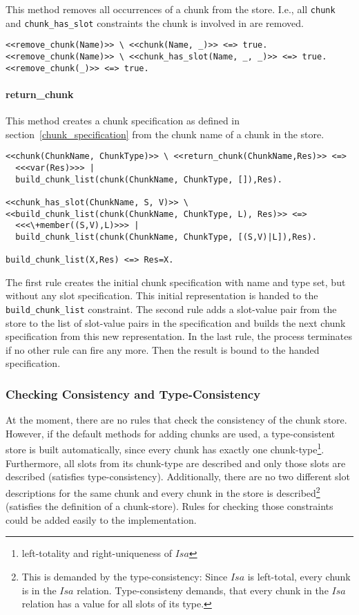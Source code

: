 This method removes all occurrences of a chunk from the store. I.e., all \lstinline|chunk| and \lstinline|chunk_has_slot| constraints the chunk is involved in are removed.

\begin{lstlisting}
<<remove_chunk(Name)>> \ <<chunk(Name, _)>> <=> true.
<<remove_chunk(Name)>> \ <<chunk_has_slot(Name, _, _)>> <=> true.
<<remove_chunk(_)>> <=> true.
\end{lstlisting}

\paragraph{return\_chunk}

This method creates a chunk specification as defined in section~\ref{chunk_specification} from the chunk name of a chunk in the store.

\begin{lstlisting}[caption={rules for \texttt{return\_chunk}}]
<<chunk(ChunkName, ChunkType)>> \ <<return_chunk(ChunkName,Res)>> <=> 
  <<<var(Res)>>> | 
  build_chunk_list(chunk(ChunkName, ChunkType, []),Res).

<<chunk_has_slot(ChunkName, S, V)>> \ <<build_chunk_list(chunk(ChunkName, ChunkType, L), Res)>> <=> 
  <<<\+member((S,V),L)>>> | 
  build_chunk_list(chunk(ChunkName, ChunkType, [(S,V)|L]),Res).
  
build_chunk_list(X,Res) <=> Res=X.
\end{lstlisting}

The first rule creates the initial chunk specification with name and type set, but without any slot specification. This initial representation is handed to the \lstinline|build_chunk_list| constraint. The second rule adds a slot-value pair from the store to the list of slot-value pairs in the specification and builds the next chunk specification from this new representation. In the last rule, the process terminates if no other rule can fire any more. Then the result is bound to the handed specification.

\subsubsection{Checking Consistency and Type-Consistency}

At the moment, there are no rules that check the consistency of the chunk store. However, if the default methods for adding chunks are used, a type-consistent store is built automatically, since every chunk has exactly one chunk-type\footnote{left-totality and right-uniqueness of $Isa$}. Furthermore, all slots from its chunk-type are described and only those slots are described (satisfies type-consistency). Additionally, there are no two different slot descriptions for the same chunk and every chunk in the store is described\footnote{This is demanded by the type-consistency: Since $Isa$ is left-total, every chunk is in the $Isa$ relation. Type-consisteny demands, that every chunk in the $Isa$ relation has a value for all slots of its type.} (satisfies the definition of a chunk-store). Rules for checking those constraints could be added easily to the implementation.

